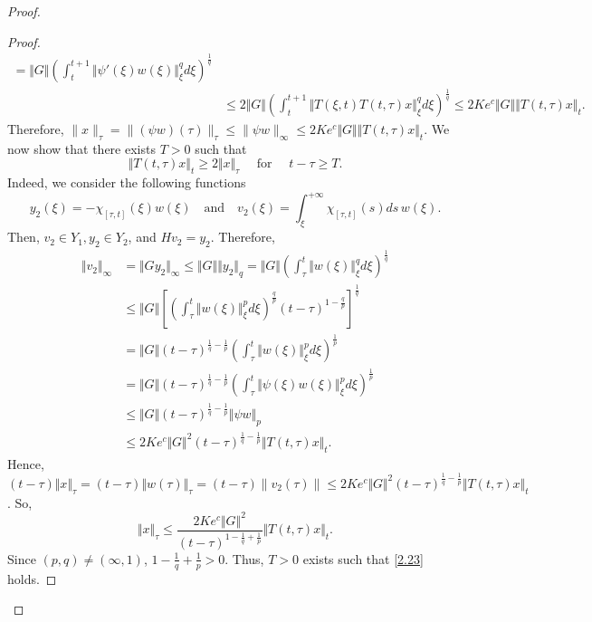 \documentclass[reqno]{amsart}
\begin{document}
\begin{proof}
\begin{proof}
\begin{align*}
=\Vert G \Vert \left( \displaystyle \int_{t}^{t+1} \Vert \psi'(\xi) w(\xi) \Vert ^q_{\xi} d\xi\right)^{\frac{1}{q}}\\
&\leq 2 \Vert G \Vert \left( \displaystyle \int_{t}^{t+1} \Vert T(\xi ,t)T(t,\tau) x \Vert ^q_{\xi} d\xi\right)^{\frac{1}{q}}
\leq 2Ke^c \Vert G \Vert \Vert T(t,\tau)x\Vert _t.
\end{align*} 
Therefore, $\|x\|_{\tau}=\|(\psi w)(\tau)\|_{\tau} \le \|\psi w\|_{\infty}  \le 2Ke^c \Vert G \Vert \Vert T(t,\tau)x\Vert _t$.
We now show that there exists $T>0$ such that 
\begin{equation}
\Vert T(t,\tau)x\Vert _t \geq 2 \Vert x\Vert _{\tau} \quad  \text{ for } \quad t-\tau \geq T.  \label{2.23}
\end{equation}
Indeed, we consider the following functions
$$ y_2 (\xi)=- \chi _{[\tau ,t]}(\xi) w (\xi) \quad\text{and}\quad  v_2(\xi)=\int_{\xi}^{+\infty}\chi _{[\tau ,t]}(s)ds\, w(\xi).$$
Then, $v_2\in Y_1, y_2 \in Y_2$, and $Hv_2=y_2$. Therefore,
\begin{align*}
 \Vert v_2 \Vert _{\infty}&=\Vert G y_2 \Vert _{\infty} \leq \Vert G \Vert \Vert y_2 \Vert _{q}
 =\Vert G \Vert \left(  \displaystyle \int_{\tau}^{t} \Vert w (\xi) \Vert ^q_{\xi} d\xi\right)^{\frac{1}{q}}\\
 &\leq \Vert G \Vert \left[ \left(  \displaystyle \int_{\tau}^{t} \Vert w (\xi) \Vert ^p_{\xi} d\xi\right)^{\frac{q}{p}}(t-\tau)^{1-\frac{q}{p}}\right]^{\frac{1}{q}}\\
 &=\Vert G \Vert (t-\tau)^{\frac{1}{q}-\frac{1}{p}} \left(  \displaystyle \int_{\tau}^{t} \Vert w (\xi) \Vert ^p_{\xi} d\xi\right)^{\frac{1}{p}}\\
 &=\Vert G \Vert (t-\tau)^{\frac{1}{q}-\frac{1}{p}} \left(  \displaystyle \int_{\tau}^{t} \Vert \psi (\xi) w (\xi) \Vert ^p_{\xi} d\xi\right)^{\frac{1}{p}}\\
 &\leq \Vert G \Vert (t-\tau)^{\frac{1}{q}-\frac{1}{p}} \Vert \psi w \Vert _{p}\\
 &\leq 2Ke^c \Vert G \Vert ^2 (t-\tau)^{\frac{1}{q}-\frac{1}{p}} \Vert T(t,\tau)x \Vert _t.
\end{align*}
Hence, $(t-\tau)\Vert x \Vert _{\tau}=(t-\tau)\Vert w (\tau) \Vert _{\tau}=(t-\tau)\|v_2(\tau)\| \le 2Ke^c \Vert G \Vert ^2 (t-\tau)^{\frac{1}{q}-\frac{1}{p}} \Vert T(t,\tau)x \Vert _t$. So,
$$\Vert x \Vert _{\tau} \leq \dfrac{2Ke^{c}\Vert G \Vert ^2}{(t-\tau)^{1-\frac{1}{q}+\frac{1}{p}}}\Vert T(t,\tau)x \Vert _t.$$
Since $(p,q)\ne (\infty,1)$, $1-\frac{1}{q}+\frac{1}{p}>0$. Thus, $T>0$ exists such that \eqref{2.23} holds.


\end{proof}
\end{proof}
\end{document}
